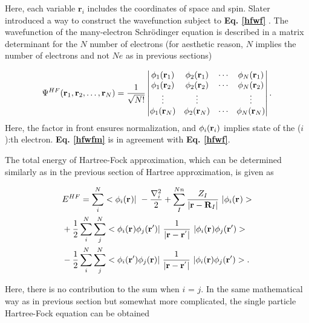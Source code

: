 \documentclass[a4paper, 12pt, titlepage,oneside,drop]{kthesis}
\begin{document}
Here, each variable ${\textbf{r}_{{i}}}$ includes the coordinates of space and spin. Slater introduced a way to construct the wavefunction subject to \textbf{Eq. \ref{hfwf}} \cite{slater1951simplification}. The wavefunction of the many-electron 
Schrödinger equation is described in a matrix determinant for the $N$ number of electrons (for aesthetic reason, $N$ implies the number of electrons and not $Ne$ as in previous sections)

\begin{equation}\label{hfwfm}
\Psi^{HF}(\textbf{r}_1, \textbf{r}_2, \ldots, \textbf{r}_N) =
\frac{1}{\sqrt{N!}} \left|
\begin{matrix}
    \bwff<1><1> & \bwff<2><1> & \cdots & \bwff<N><1> \\
    \bwff<1><2> & \bwff<2><2> & \cdots & \bwff<N><2> \\
    \vdots               & \vdots               &        & \vdots               \\
    \bwff<1><N> & \bwff<2><N> & \cdots & \bwff<N><N>
\end{matrix} \right|.
\end{equation}
\noindent Here, the factor in front ensures normalization, and $\bwff<i><i>$ implies state of the ($i$):th electron. \textbf{Eq. \ref{hfwfm}} is in agreement with \textbf{Eq. \ref{hfwf}}.

The total energy of Hartree-Fock approximation, which can be determined similarly as in the previous section of Hartree approximation, is given as

\begin{equation}\begin{split}
&E^{HF} = \sum\limits_i^{{N}} <\bwff<i><> |\ -\frac{\nabla^{2}_{i}}{2} + \sum\limits_I^{{Nn}} \frac{Z_{I}}{|\textbf{r}-\textbf{R}_{I}|}  \ | \bwff<i><> > \\
& + \frac{1}{2} \sum\limits_i^{{N}} \sum\limits_j^{{N}} <\bwff<i><> \bwfn<j><'>|\ \frac{1}{|\textbf{r} - \textbf{r}^{'} |} \ | \bwff<i><> \bwfn<j><'>> \\
& - \frac{1}{2} \sum\limits_i^{{N}} \sum\limits_j^{{N}} <\bwfn<i><'> \bwfn<j><>|\ \frac{1}{|\textbf{r} - \textbf{r}^{'} |} \ | \bwfn<i><> \bwfn<j><'>>.
\end{split}\end{equation}

Here, there is no contribution to the sum when $i$ = $j$. In the same mathematical way as in previous section but somewhat more complicated, the single particle Hartree-Fock equation can be obtained
\end{document}
